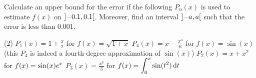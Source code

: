 \documentclass{discussion}
\begin{document}
\begin{question}
    Calculate an upper bound for the error if the following \(P_n(x)\) is used to estimate \(f(x)\) on \(\ointerval{-0.1}{0.1}\).
    Moreover, find an interval \(\ointerval{-a}{a}\) such that the error is less than \(0.001\).
    \begin{tasks}(2)
        \task \(\displaystyle P_1(x) = 1 + \frac{x}{2}\) for \(f(x) = \sqrt{1 + x}\)
        \task \(\displaystyle P_4(x) = x - \frac{x^3}{6}\) for \(f(x) = \sin(x)\) \\
        \tiny (this \(P_4\) is indeed a fourth-degree approximation of \(\sin(x)\))
        \task \(\displaystyle P_2(x) = x + x^{2}\) for \(\displaystyle f(x) = \sin(x) e^{x}\)
        \task \(\displaystyle P_{3}(x) = \frac{x^3}{3}\) for \(\displaystyle f(x) = \int_{0}^{x} \sin(t^2) \odif{t}\)
    \end{tasks}
\end{question}

\end{document}
